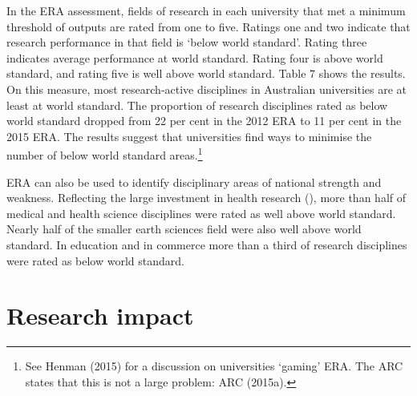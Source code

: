\documentclass{grattan}
\begin{document}
In the ERA assessment, fields of research in each university that met a minimum threshold of outputs are rated from one to five. Ratings one and two indicate that research performance in that field is `below world standard'. Rating three indicates average performance at world standard. Rating four is above world standard, and rating five is well above world standard. Table 7 shows the results. On this measure, most research-active disciplines in Australian universities are at least at world standard. The proportion of research disciplines rated as below world standard dropped from 22 per cent in the 2012 ERA to 11 per cent in the 2015 ERA. The results suggest that universities find ways to minimise the number of below world standard areas.\footnote{See Henman (2015) for a discussion on universities `gaming' ERA. The ARC states that this is not a large problem: ARC (2015a).}

\begin{table} \caption{Excellence in Research for Australia, 2015}


\end{table}

ERA can also be used to identify disciplinary areas of national strength and weakness. Reflecting the large investment in health research (), more than half of medical and health science disciplines were rated as well above world standard. Nearly half of the smaller earth sciences field were also well above world standard. In education and in commerce more than a third of research disciplines were rated as below world standard.

%
\section{Research impact }\label{sec:research-impact}
\end{document}
